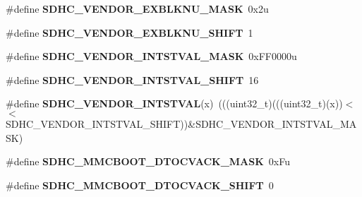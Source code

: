 \begin{DoxyCompactItemize}
\item 
\#define {\bfseries S\+D\+H\+C\+\_\+\+V\+E\+N\+D\+O\+R\+\_\+\+E\+X\+B\+L\+K\+N\+U\+\_\+\+M\+A\+SK}~0x2u\hypertarget{group__SDHC__Register__Masks_gaa0a0cbb02b6172ad044e259017665d02}{}\label{group__SDHC__Register__Masks_gaa0a0cbb02b6172ad044e259017665d02}

\item 
\#define {\bfseries S\+D\+H\+C\+\_\+\+V\+E\+N\+D\+O\+R\+\_\+\+E\+X\+B\+L\+K\+N\+U\+\_\+\+S\+H\+I\+FT}~1\hypertarget{group__SDHC__Register__Masks_gafc7b41b0f492ed43f488063697000cf3}{}\label{group__SDHC__Register__Masks_gafc7b41b0f492ed43f488063697000cf3}

\item 
\#define {\bfseries S\+D\+H\+C\+\_\+\+V\+E\+N\+D\+O\+R\+\_\+\+I\+N\+T\+S\+T\+V\+A\+L\+\_\+\+M\+A\+SK}~0x\+F\+F0000u\hypertarget{group__SDHC__Register__Masks_ga59d8694a1bf1d55be388439ed4419ab3}{}\label{group__SDHC__Register__Masks_ga59d8694a1bf1d55be388439ed4419ab3}

\item 
\#define {\bfseries S\+D\+H\+C\+\_\+\+V\+E\+N\+D\+O\+R\+\_\+\+I\+N\+T\+S\+T\+V\+A\+L\+\_\+\+S\+H\+I\+FT}~16\hypertarget{group__SDHC__Register__Masks_ga3610161a11c6ef0ef2849ef4fca8d12f}{}\label{group__SDHC__Register__Masks_ga3610161a11c6ef0ef2849ef4fca8d12f}

\item 
\#define {\bfseries S\+D\+H\+C\+\_\+\+V\+E\+N\+D\+O\+R\+\_\+\+I\+N\+T\+S\+T\+V\+AL}(x)~(((uint32\+\_\+t)(((uint32\+\_\+t)(x))$<$$<$S\+D\+H\+C\+\_\+\+V\+E\+N\+D\+O\+R\+\_\+\+I\+N\+T\+S\+T\+V\+A\+L\+\_\+\+S\+H\+I\+FT))\&S\+D\+H\+C\+\_\+\+V\+E\+N\+D\+O\+R\+\_\+\+I\+N\+T\+S\+T\+V\+A\+L\+\_\+\+M\+A\+SK)\hypertarget{group__SDHC__Register__Masks_ga760d0546097587595fec8f13765b6b2e}{}\label{group__SDHC__Register__Masks_ga760d0546097587595fec8f13765b6b2e}

\item 
\#define {\bfseries S\+D\+H\+C\+\_\+\+M\+M\+C\+B\+O\+O\+T\+\_\+\+D\+T\+O\+C\+V\+A\+C\+K\+\_\+\+M\+A\+SK}~0x\+Fu\hypertarget{group__SDHC__Register__Masks_ga243f17fb68ebb17a8a62a31a34530a1f}{}\label{group__SDHC__Register__Masks_ga243f17fb68ebb17a8a62a31a34530a1f}

\item 
\#define {\bfseries S\+D\+H\+C\+\_\+\+M\+M\+C\+B\+O\+O\+T\+\_\+\+D\+T\+O\+C\+V\+A\+C\+K\+\_\+\+S\+H\+I\+FT}~0\hypertarget{group__SDHC__Register__Masks_ga63ba85bfa2ccf68011e8afcf6f2c03b4}{}\label{group__SDHC__Register__Masks_ga63ba85bfa2ccf68011e8afcf6f2c03b4}


\end{DoxyCompactItemize}
